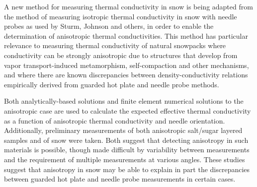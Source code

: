A new method for measuring thermal conductivity in snow is being adapted from 
the method of measuring isotropic thermal conductivity in snow with needle
probes as used by Sturm, Johnson and others, in order to enable the
determination of anisotropic thermal conductivities. \cite{sturm1,sturm2} This
method has particular relevance to measuring thermal conductivity of natural
snowpacks where conductivity can be strongly anisotropic due to structures that
develop from vapor transport-induced metamorphism, self-compaction and other
mechanisms, and where there are known discrepancies between density-conductivity
relations empirically derived from guarded hot plate and needle probe methods.

Both analytically-based solutions and finite element numerical solutions to the
anisotropic case are used to calculate the expected effective thermal
conductivity as a function of anisotropic thermal conductivity and needle
orientation. Additionally, preliminary measurements of both anisotropic salt/sugar
layered samples and of snow were taken. Both suggest that detecting anisotropy
in such materials is possible, though made difficult by variability between
measurements and the requirement of multiple
measurements at various angles. These studies suggest that
anisotropy in snow may be able to explain in part the discrepancies between
guarded hot plate and needle probe measurements in certain cases.
